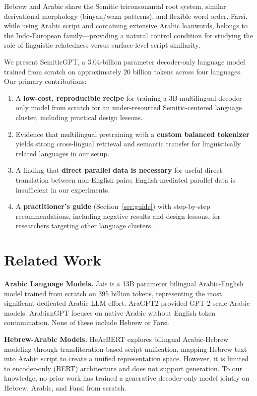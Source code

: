 \documentclass[10pt,twocolumn]{article}
\begin{document}
Hebrew and Arabic share the Semitic triconsonantal root system, similar derivational morphology (binyan/wazn patterns), and flexible word order. Farsi, while using Arabic script and containing extensive Arabic loanwords, belongs to the Indo-European family---providing a natural control condition for studying the role of linguistic relatedness versus surface-level script similarity.

We present SemiticGPT, a 3.04-billion parameter decoder-only language model trained from scratch on approximately 20 billion tokens across four languages. Our primary contributions:

\begin{enumerate}
    \item A \textbf{low-cost, reproducible recipe} for training a 3B multilingual decoder-only model from scratch for an under-resourced Semitic-centered language cluster, including practical design lessons.
    \item Evidence that multilingual pretraining with a \textbf{custom balanced tokenizer} yields strong cross-lingual retrieval and semantic transfer for linguistically related languages in our setup.
    \item A finding that \textbf{direct parallel data is necessary} for useful direct translation between non-English pairs; English-mediated parallel data is insufficient in our experiments.
    \item A \textbf{practitioner's guide} (Section~\ref{sec:guide}) with step-by-step recommendations, including negative results and design lessons, for researchers targeting other language clusters.
\end{enumerate}

\section{Related Work}

\textbf{Arabic Language Models.} Jais \citep{sengupta2023jais} is a 13B parameter bilingual Arabic-English model trained from scratch on 395 billion tokens, representing the most significant dedicated Arabic LLM effort. AraGPT2 \citep{antoun2021aragpt2} provided GPT-2 scale Arabic models. ArabianGPT \citep{koubaa2024arabiangpt} focuses on native Arabic without English token contamination. None of these include Hebrew or Farsi.

\textbf{Hebrew-Arabic Models.} HeArBERT \citep{rivas2024hearbert} explores bilingual Arabic-Hebrew modeling through transliteration-based script unification, mapping Hebrew text into Arabic script to create a unified representation space. However, it is limited to encoder-only (BERT) architecture and does not support generation. To our knowledge, no prior work has trained a generative decoder-only model jointly on Hebrew, Arabic, and Farsi from scratch.
\end{document}

